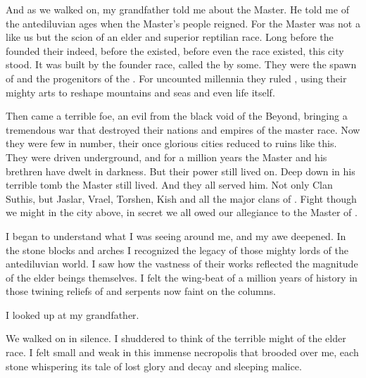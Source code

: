 \documentclass
  [a4paper,
   12pt,
   oneside
  ]%
  {article}
\begin{document}

And as we walked on, my grandfather told me about the Master. 
He told me of the antediluvian ages when the Master's people reigned.
For the Master was not a \scatha like us but the scion of an elder and superior reptilian race.%
\index{\scatha}
Long before the \humans founded their \VaimonCaliphate\dash indeed, before the \humans existed, before even the \scatha race existed, this city stood.%
\index{\human}%
\index{\VaimonCaliphate}
It was built by the founder race, called the \ophidians by some.
They were the spawn of \dragons and the progenitors of the \scathae.%
\index{\dragon}
For uncounted millennia they ruled \Miith, using their mighty arts to reshape mountains and seas and even life itself. 

Then came a terrible foe, an evil from the black void of the Beyond, bringing a tremendous war that destroyed their nations and empires of the master race.
Now they were few in number, their once glorious cities reduced to ruins like this.
They were driven underground, and for a million years the Master and his brethren have dwelt in darkness. 
But their power still lived on. 
Deep down in his terrible tomb the Master still lived.
And they all served him.
Not only Clan Suthis, but Jaslar, Vrael, Torshen, Kish and all the major clans of \Yormis.
Fight though we might in the city above, in secret we all owed our allegiance to the Master of \Yormis. 

I began to understand what I was seeing around me, and my awe deepened. 
In the stone blocks and arches I recognized the legacy of those mighty lords of the antediluvian world. 
I saw how the vastness of their works reflected the magnitude of the elder beings themselves. 
I felt the wing-beat of a million years of history in those twining reliefs of \dragons and serpents now faint on the columns.\index{\dragon}

I looked up at my grandfather.




We walked on in silence. 
I shuddered to think of the terrible might of the elder race. 
I felt small and weak in this immense necropolis that brooded over me, each stone whispering its tale of lost glory and decay and sleeping malice. 
\end{document}
